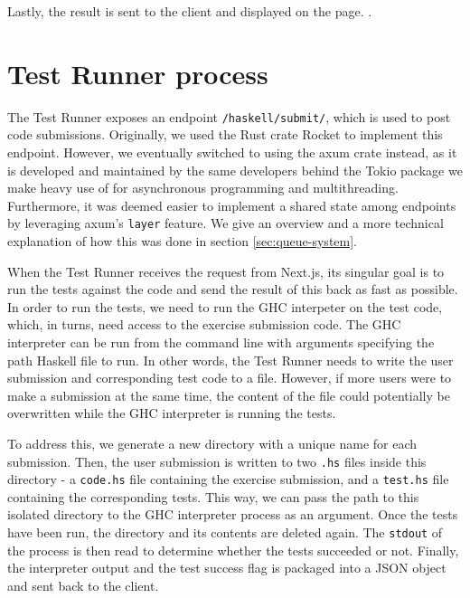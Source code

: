 Lastly, the result is sent to the client and displayed on the page.
.

\section{Test Runner process} \label{sec:test_runner_process}
The Test Runner exposes an endpoint \texttt{/haskell/submit/}, which is used to post code submissions.
Originally, we used the Rust crate Rocket to implement this endpoint.
However, we eventually switched to using the axum crate instead, as it is developed and maintained by the same developers behind the Tokio package we make heavy use of for asynchronous programming and multithreading.
Furthermore, it was deemed easier to implement a shared state among endpoints by leveraging axum's \texttt{layer} feature.
We give an overview and a more technical explanation of how this was done in section \ref{sec:queue-system}.

When the Test Runner receives the request from Next.js, its singular goal is to run the tests against the code and send the result of this back as fast as possible.
In order to run the tests, we need to run the GHC interpeter on the test code, which, in turns, need access to the exercise submission code.
The GHC interpreter can be run from the command line with arguments specifying the path Haskell file to run.
In other words, the Test Runner needs to write the user submission and corresponding test code to a file.
However, if more users were to make a submission at the same time, the content of the file could potentially be overwritten while the GHC interpreter is running the tests.

To address this, we generate a new directory with a unique name for each submission.
Then, the user submission is written to two  \texttt{.hs} files inside this directory - a \texttt{code.hs} file containing the exercise submission, and a \texttt{test.hs} file containing the corresponding tests.
This way, we can pass the path to this isolated directory to the GHC interpreter process as an argument.
Once the tests have been run, the directory and its contents are deleted again.
The \texttt{stdout} of the process is then read to determine whether the tests succeeded or not.
Finally, the interpreter output and the test success flag is packaged into a JSON object and sent back to the client.

